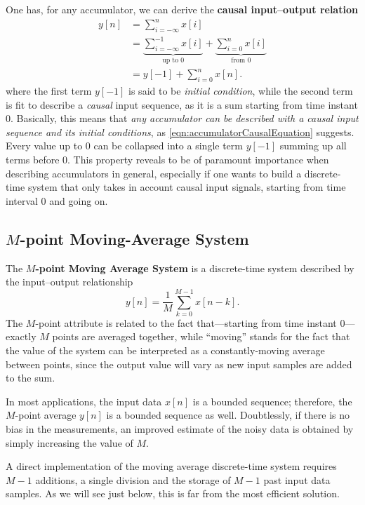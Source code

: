 \documentclass[\documentfontsize, twocolumn]{\classname}
\begin{document}
One has, for any accumulator, we can derive the \textbf{causal input--output relation}
\begin{align}
    y[n] &= \sum_{i=-\infty}^{n} x[i] \\
         &= \underbrace{\sum_{i=-\infty}^{-1} x[i]}_{\mbox{up to } 0} + \underbrace{\sum_{i=0}^{n}x[i]}_{\mbox{from } 0}\\
         &= y[-1] + \sum_{i=0}^n x[n].\label{eqn:accumulatorCausalEquation}
\end{align}
where the first term $y[-1]$ is said to be \emph{initial condition}, while the second term is fit to describe a \emph{causal} input sequence, as it is a sum starting from time instant $0$. Basically, this means that \emph{any accumulator can be described with a causal input sequence and its initial conditions}, as \ref{eqn:accumulatorCausalEquation} suggests. Every value up to $0$ can be collapsed into a single term $y[-1]$ summing up all terms before $0$. This property reveals to be of paramount importance when describing accumulators in general, especially if one wants to build a discrete-time system that only takes in account causal input signals, starting from time interval $0$ and going on.

\subsection{$M$-point Moving-Average System}

The \textbf{$M$-point Moving Average System} is a discrete-time system described by the input--output relationship
\begin{equation}\label{eqn:mPointMovingAverageEquation}
    y[n] = \frac 1 M \sum_{k=0}^{M-1} x[n-k].
\end{equation}
The $M$-point attribute is related to the fact that---starting from time instant $0$---exactly $M$ points are averaged together, while ``moving'' stands for the fact that the value of the system can be interpreted as a constantly-moving average between points, since the output value will vary as new input samples are added to the sum.

In most applications, the input data $x[n]$ is a bounded sequence; therefore, the $M$-point average $y[n]$ is a bounded sequence as well. Doubtlessly, if there is no bias in the measurements, an improved estimate of the noisy data is obtained by simply increasing the value of $M$.

A direct implementation of the moving average discrete-time system requires $M-1$ additions, a single division and the storage of $M-1$ past input data samples. As we will see just below, this is far from the most efficient solution.
\end{document}

